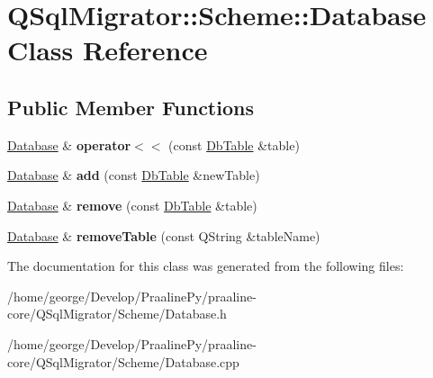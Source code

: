 \hypertarget{class_q_sql_migrator_1_1_scheme_1_1_database}{}\section{Q\+Sql\+Migrator\+:\+:Scheme\+:\+:Database Class Reference}
\label{class_q_sql_migrator_1_1_scheme_1_1_database}
\subsection*{Public Member Functions}
\begin{DoxyCompactItemize}
\item 
\mbox{\label{class_q_sql_migrator_1_1_scheme_1_1_database_a171ce84b5baa23bda1ffd18ece0a282f}} 
\hyperlink{class_q_sql_migrator_1_1_scheme_1_1_database}{Database} \& {\bfseries operator$<$$<$} (const \hyperlink{class_q_sql_migrator_1_1_scheme_1_1_db_table}{Db\+Table} \&table)
\item 
\mbox{\label{class_q_sql_migrator_1_1_scheme_1_1_database_a77ed29af79b49e042344b03e24c667ca}} 
\hyperlink{class_q_sql_migrator_1_1_scheme_1_1_database}{Database} \& {\bfseries add} (const \hyperlink{class_q_sql_migrator_1_1_scheme_1_1_db_table}{Db\+Table} \&new\+Table)
\item 
\mbox{\label{class_q_sql_migrator_1_1_scheme_1_1_database_aef366aceed0390f3a3e69415b9c5ebbf}} 
\hyperlink{class_q_sql_migrator_1_1_scheme_1_1_database}{Database} \& {\bfseries remove} (const \hyperlink{class_q_sql_migrator_1_1_scheme_1_1_db_table}{Db\+Table} \&table)
\item 
\mbox{\label{class_q_sql_migrator_1_1_scheme_1_1_database_a2a7aaadbd7d94e76eed3527c48ce282d}} 
\hyperlink{class_q_sql_migrator_1_1_scheme_1_1_database}{Database} \& {\bfseries remove\+Table} (const Q\+String \&table\+Name)
\end{DoxyCompactItemize}


The documentation for this class was generated from the following files\+:\begin{DoxyCompactItemize}
\item 
/home/george/\+Develop/\+Praaline\+Py/praaline-\/core/\+Q\+Sql\+Migrator/\+Scheme/Database.\+h\item 
/home/george/\+Develop/\+Praaline\+Py/praaline-\/core/\+Q\+Sql\+Migrator/\+Scheme/Database.\+cpp\end{DoxyCompactItemize}

